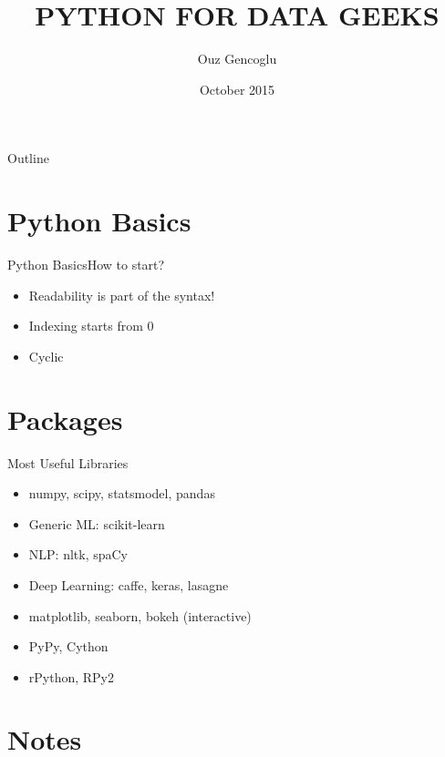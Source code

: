 \documentclass{beamer}
\title{PYTHON FOR DATA GEEKS}
\author{Ouz Gencoglu}
\institute[TUT] %
{

  Tampere University of Technology, Finland

}
\date{October 2015}
\begin{document}
\begin{frame}
	\titlepage
\end{frame}

\begin{frame}{Outline}
	\tableofcontents
\end{frame}

\section{Python Basics}

\begin{frame}{Python Basics}{How to start?}

	\begin{itemize}
		\item {Readability is part of the syntax!} \pause
		\item {Indexing starts from 0}\pause
		\item {Cyclic}\pause

	\end{itemize}
	
\end{frame}

\section{Packages}

\begin{frame}{Most Useful Libraries}

	\begin{itemize}
		\item {numpy, scipy, statsmodel, pandas} \pause
		\item {Generic ML: scikit-learn}\pause
		\item {NLP: nltk, spaCy}\pause
		\item {Deep Learning: caffe, keras, lasagne}\pause
		\item {matplotlib, seaborn, bokeh (interactive) }\pause
		\item {PyPy, Cython	}\pause
		\item {rPython, RPy2}
	\end{itemize}
	
\end{frame}

\section{Notes}
\end{document}
